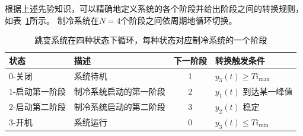 根据上述先验知识，可以精确地定义系统的各个阶段并给出阶段之间的转换规则，如表~\ref{tab:cooling_dfa}所示。
制冷系统在$N=4$个阶段之间依周期地循环切换。
\begin{table}[]
    \centering
    \caption{跳变系统在四种状态下循环，每种状态对应制冷系统的一个阶段}
    \label{tab:cooling_dfa}
    \begin{tabular}{llcl}
    \toprule
       状态                  &    描述             & 下一阶段 & 转换触发条件                                   \\ 
       \hline
    0-关闭                       & 系统待机                             & 1          & $y_3(t)\geq Ti_{\max}$                                \\
    1-启动第一阶段                      & 制冷系统启动的第一阶段                     & 2          & $y_1(t)$ 到达某一峰值                            \\
    2-启动第二阶段                       & 制冷系统启动的第二阶段 & 3          & \multicolumn{1}{l}{$y_2(t)$ 稳定} \\
    3-开机                       & 系统运行                                   & 0          & $y_3(t)\leq Ti_{\min}$                                \\
    \bottomrule
    \end{tabular}
\end{table}



